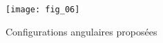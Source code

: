 \ifprof
\else
\begin{figure}[H]
\centering
\texttt{[image: fig\_06]}
\caption{Configurations angulaires proposées \label{fig_06}}
\end{figure}
\fi
%
%
%
%
%
%
%
%
%
